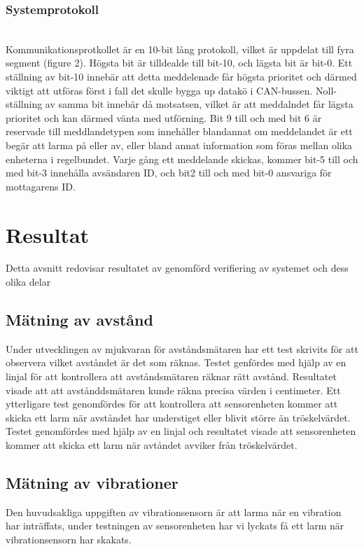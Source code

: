 \documentclass{article}
\begin{document}
\subsubsection{Systemprotokoll}\\
Kommunikationsprotkollet är en 10-bit lång protokoll, vilket är uppdelat till fyra segment (figure 2). Högsta bit är tilldealde till bit-10, och lägsta bit är bit-0. Ett ställning av bit-10 innebär att detta meddelenade får högsta prioritet och därmed viktigt att utföras först i fall det skulle bygga up datakö i CAN-bussen. Noll-ställning av samma bit innebär då motsatsen, vilket är att meddalndet får lägsta prioritet och kan därmed vänta med utförning. Bit 9 till och med bit 6 är reservade till meddlandetypen som innehåller blandannat om meddelandet är ett begär att larma på eller av, eller bland annat information som föras mellan olika enheterna i regelbundet. Varje gång ett meddelande skickas, kommer bit-5 till och med bit-3 innehålla avsändaren ID, och bit2 till och med bit-0 ansvariga för mottagarens ID. 

\section{Resultat}
Detta avsnitt redovisar resultatet av genomförd verifiering av systemet och dess olika delar

\subsection{Mätning av avstånd}
Under utvecklingen av mjukvaran för avståndsmätaren har ett test skrivits för att observera vilket avståndet är det som räknas. Testet genfördes med hjälp av en linjal för att kontrollera att avståndsmätaren räknar rätt avstånd. Resultatet visade att att avstånddsmätaren kunde räkna precisa värden i centimeter. Ett ytterligare test genomfördes för att kontrollera att sensorenheten kommer att skicka ett larm när avståndet har understiget eller blivit större än tröskelvärdet. Testet genomfördes med hjälp av en linjal och resultatet visade att sensorenheten kommer att skicka ett larm när avtåndet avviker från tröskelvärdet. 

\subsection{Mätning av vibrationer}
Den huvudsakliga uppgiften av vibrationsensorn är att larma när en vibration har inträffats, under testningen av sensorenheten har vi lyckats få ett larm när vibrationsensorn har skakats.
\end{document}
